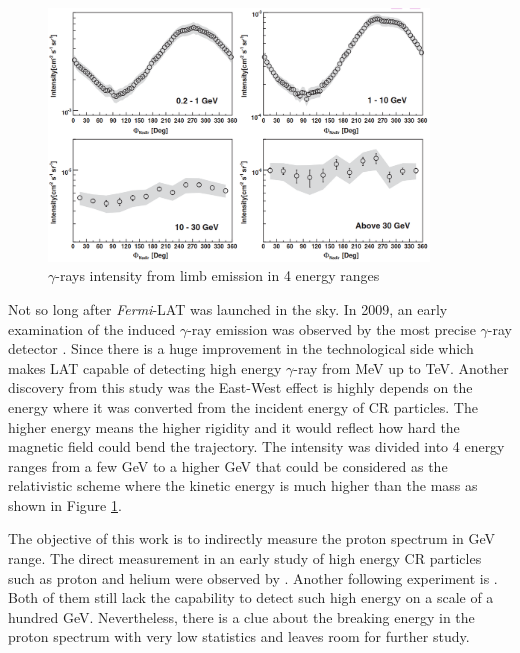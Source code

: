\begin{figure}[h!]
    \centering
    \includegraphics[width=0.9\textwidth]{content/literature_review/figures/fermi_eastwest.png}
    \caption{
        $\gamma$-rays intensity from limb emission in 4 energy ranges
        \citep{fermilat_gamma_induced}
    }
    \label{fig:fermi_eastwest}
\end{figure}

Not so long after \textit{Fermi}-LAT was launched in the sky. In 2009,
an early examination of the induced $\gamma$-ray emission was 
observed by the most precise $\gamma$-ray detector
\cite{fermilat_gamma_induced}. Since there 
is a huge improvement in the technological side which makes LAT 
capable of detecting high energy $\gamma$-ray from MeV up to TeV.
Another discovery from this study was the East-West effect is highly 
depends on the energy where it was converted from the incident energy of CR particles. The higher energy means the higher rigidity
and it would reflect how hard the magnetic field could bend the trajectory.
The intensity was divided into 4 energy ranges from a few GeV 
to a higher GeV that could be considered as the relativistic scheme 
where the kinetic energy is much higher than the mass as shown 
in Figure \ref{fig:fermi_eastwest}.

The objective of this work is to indirectly measure the proton spectrum in 
GeV range. The direct measurement in an early study of high energy 
CR particles such as proton and helium were observed by \cite{bess_experiment}.
Another following experiment is \cite{adriani2011pamela}. Both of 
them still lack the capability to detect such high energy on a scale of 
a hundred GeV. Nevertheless, there is a clue about the breaking energy 
in the proton spectrum with very low statistics and leaves room for further study.


